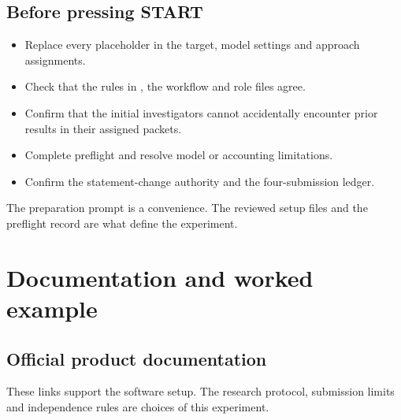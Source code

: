 \documentclass[11pt,a4paper]{article}
\newcommand{\pathcode}[1]{\texttt{\small\detokenize{#1}}}
\begin{document}
\subsection*{Before pressing START}
\begin{itemize}
\item Replace every placeholder in the target, model settings and approach assignments.
\item Check that the rules in \pathcode{AGENTS.md}, the workflow and role files agree.
\item Confirm that the initial investigators cannot accidentally encounter prior results in their assigned packets.
\item Complete preflight and resolve model or accounting limitations.
\item Confirm the statement-change authority and the four-submission ledger.
\end{itemize}

The preparation prompt is a convenience. The reviewed setup files and the preflight record are what define the experiment.
\newpage

\section*{Documentation and worked example}
\subsection*{Official product documentation}
These links support the software setup. The research protocol, submission limits and independence rules are choices of this experiment.
\end{document}
